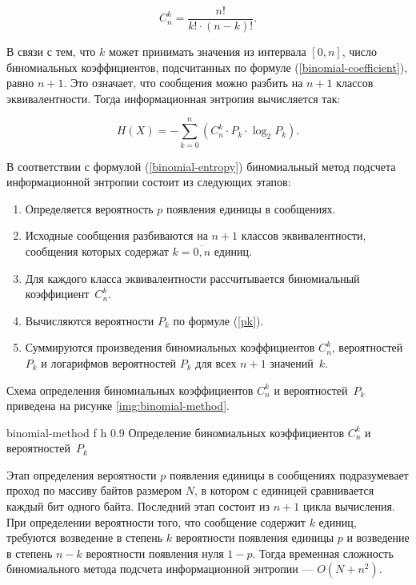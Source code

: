 \begin{equation}\label{binomial-coefficient}
	C_{n}^k = \frac{n!}{k! \cdot (n - k)!}.
\end{equation}

В связи с тем, что $k$ может принимать значения из интервала $[0, n]$, число биномиальных коэффициентов, подсчитанных по формуле (\ref{binomial-coefficient}), равно $n + 1$. Это означает, что сообщения можно разбить на $n + 1$ классов эквивалентности. Тогда информационная энтропия вычисляется так:

\begin{equation}\label{binomial-entropy}
	H(X) = -\sum_{k = 0}^n (C_{n}^k \cdot P_{k} \cdot \log_{2}P_{k}).
\end{equation}

В соответствии с формулой (\ref{binomial-entropy}) биномиальный метод подсчета информационной энтропии состоит из следующих этапов:

\begin{enumerate}
	\item Определяется вероятность $p$ появления единицы в сообщениях.
	\item Исходные сообщения разбиваются на $n + 1$ классов эквивалентности, сообщения которых содержат $k = \overline{0, n}$ единиц.
	\item Для каждого класса эквивалентности рассчитывается биномиальный коэффициент~$C_{n}^k$.
	\item Вычисляются вероятности $P_{k}$ по формуле (\ref{pk}).
	\item Суммируются произведения биномиальных коэффициентов $C_{n}^k$, вероятностей $P_{k}$ и логарифмов вероятностей $P_{k}$ для всех $n + 1$ значений~$k$.
\end{enumerate}

Схема определения биномиальных коэффициентов $C_{n}^k$ и вероятностей~$P_{k}$ приведена на рисунке \ref{img:binomial-method}.

    {binomial-method}
    {f}
    {h}
    {0.9\textwidth}
    {Определение биномиальных коэффициентов $C_{n}^k$ и вероятностей~$P_{k}$}

Этап определения вероятности $p$ появления единицы в сообщениях подразумевает проход по массиву байтов размером $N$, в котором с единицей сравнивается каждый бит одного байта. Последний этап состоит из $n + 1$ цикла вычисления. При определении вероятности того, что сообщение содержит $k$ единиц, требуются возведение в степень $k$ вероятности появления единицы $p$ и возведение в степень $n - k$ вероятности появления нуля $1 - p$. Тогда временная сложность биномиального метода подсчета информационной энтропии --- $O(N + n^2)$.

